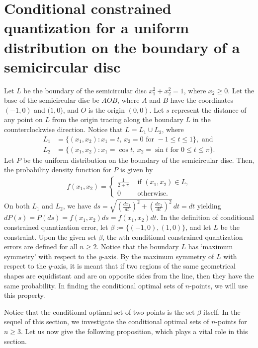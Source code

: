 \documentclass[12pt, reqno]{amsart}
\theoremstyle{plain}
\theoremstyle{definition}
\newcommand{\uu}{\cup}%
\newcommand{\set}[1]{\{#1\}}%
\newcommand{\gb}{\beta}
\newcommand{\te}{\text}%
\begin{document}
 \section{Conditional constrained quantization for a uniform distribution on the boundary of a semicircular disc} \label{secMe1}
 Let $L$ be the boundary of the semicircular disc $x_1^2+x_2^2=1$, where $x_2\geq 0$. Let the base of the semicircular disc be $AOB$, where $A$ and $B$ have the coordinates $(-1, 0)$ and $(1,0$), and $O$ is the origin $(0, 0)$. Let $s$ represent the distance of any point on $L$ from the origin tracing along the boundary $L$ in the counterclockwise direction. Notice that $L=L_1\uu L_2$,
where
\begin{align*}
L_1&=\set{(x_1, x_2) : x_1=t, \, x_2=0 \te{ for } -1\leq t\leq 1}, \te{ and }\\
L_2&=\set{(x_1, x_2) : x_1=\cos t, \, x_2=\sin t\te{ for } 0\leq t\leq \pi}.
\end{align*}
Let $P$ be the uniform distribution on the boundary of the semicircular disc. Then, the probability density function for $P$ is given by 
\begin{align*}
 f(x_1, x_2)=\left\{\begin{array}{cc}
\frac 1 {2+\pi}  & \te{ if } (x_1, x_2) \in L,\\
0 & \te{ otherwise.}
\end{array}\right.  
\end{align*}
 On both $L_1$ and $L_2$, we have $ds=\sqrt{(\frac {dx_1}{dt})^2 +(\frac {dx_2}{dt})^2} \, dt=dt$ yielding $dP(s)=P(ds)=f(x_1, x_2)ds=f(x_1, x_2) dt$.
In the definition of conditional constrained quantization error, let $\gb:=\set{(-1, 0), (1, 0)}$, and let $L$ be the constraint. Upon the given set $\gb$, the $n$th conditional constrained quantization errors are defined for all $n\geq 2$. Notice that the boundary $L$ has `maximum symmetry' with respect to the $y$-axis. By the maximum symmetry of $L$ with respect to the $y$-axis, it is meant that if two regions of the same geometrical shapes are equidistant and are on opposite sides from the line, then they have the same probability. In finding the conditional optimal sets of $n$-points, we will use this property.  

Notice that the conditional optimal set of two-points is the set $\gb$ itself. In the sequel of this section, we investigate the conditional optimal sets of $n$-points for $n\geq 3$. 
Let us now give the following proposition, which plays a vital role in this section. 
\end{document}
